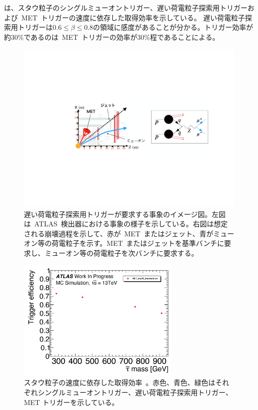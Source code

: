 は、スタウ粒子のシングルミューオントリガー、遅い荷電粒子探索用トリガーおよび~MET~トリガーの速度に依存した取得効率を示している。
遅い荷電粒子探索用トリガーは$0.6{\leq}\beta{\leq}0.8$の領域に感度があることが分かる。トリガー効率が約$30\%$であるのは~MET~トリガーの効率が$30\%$程であることによる。

\begin{figure}[H]
        \centering   
        \includegraphics[width=\textwidth,page=1]{img/pdf3/met.pdf}
        \caption[遅い荷電粒子探索用トリガーが要求する事象のイメージ図]{遅い荷電粒子探索用トリガーが要求する事象のイメージ図。左図は~ATLAS~検出器における事象の様子を示している。右図は想定される崩壊過程を示して、赤が~MET~またはジェット、青がミューオン等の荷電粒子を示す。MET~またはジェットを基準バンチに要求し、ミューオン等の荷電粒子を次バンチに要求する。}
        \label{fig:met}
\end{figure}

\begin{figure}[H]
        \centering   
        \includegraphics[width=0.7\textwidth,page=3]{img/pdf3/sumi.pdf}
        \caption[スタウ粒子の速度に依存した取得効率]{スタウ粒子の速度に依存した取得効率~\cite{MT:01}。赤色、青色、緑色はそれぞれシングルミューオントリガー、遅い荷電粒子探索用トリガー、MET トリガーを示している。}
        \label{fig:sumi3}
\end{figure}

